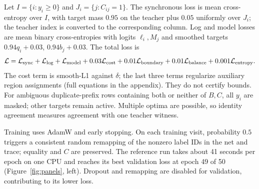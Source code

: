 \documentclass[manuscript,screen,nonacm]{acmart}
\begin{document}
Let $I=\{i:y_i\geq0\}$ and $J_i=\{j:C_{ij}=1\}$. The synchronous loss is mean cross-entropy over $I$, with target mass $0.95$ on the teacher plus $0.05$ uniformly over $J_i$; the teacher index is converted to the corresponding column. Log and model losses are mean binary cross-entropies with logits $\ell_i,M_j$ and smoothed targets $0.94q_i+0.03$, $0.94b_j+0.03$. The total loss is
\[
\mathcal L=\mathcal L_{\rm sync}+\mathcal L_{\rm log}+\mathcal L_{\rm model}
 +0.03\mathcal L_{\rm cost}+0.01\mathcal L_{\rm boundary}
 +0.01\mathcal L_{\rm balance}+0.001\mathcal L_{\rm entropy}.
\]
The cost term is smooth-L1 against $\delta$; the last three terms regularize auxiliary region assignments (full equations in the appendix). They do not certify bounds. For ambiguous duplicate-prefix rows containing both or neither of $B,C$, all $y_i$ are masked; other targets remain active. Multiple optima are possible, so identity agreement measures agreement with one teacher witness.

Training uses AdamW and early stopping. On each training visit, probability $0.5$ triggers a consistent random remapping of the nonzero label IDs in the net and trace; equality and $C$ are preserved. The reference run takes about 41 seconds per epoch on one CPU and reaches its best validation loss at epoch 49 of 50 (Figure~\ref{fig:panels}, left). Dropout and remapping are disabled for validation, contributing to its lower loss.
\end{document}
